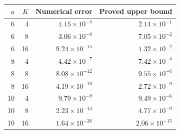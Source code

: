 \begin{tabular}{rrrr}
\toprule
$a$ & $K$ & Numerical error & Proved upper bound \\
\midrule
6 & 4 & $1.15\times10^{-5}$ & $2.14\times10^{-1}$ \\
6 & 8 & $3.06\times10^{-8}$ & $7.05\times10^{-2}$ \\
6 & 16 & $9.24\times10^{-15}$ & $1.32\times10^{-2}$ \\
8 & 4 & $4.42\times10^{-7}$ & $7.42\times10^{-4}$ \\
8 & 8 & $8.08\times10^{-12}$ & $9.55\times10^{-6}$ \\
8 & 16 & $4.19\times10^{-19}$ & $2.72\times10^{-9}$ \\
10 & 4 & $9.79\times10^{-9}$ & $9.49\times10^{-6}$ \\
10 & 8 & $2.23\times10^{-14}$ & $4.77\times10^{-9}$ \\
10 & 16 & $1.64\times10^{-26}$ & $2.06\times10^{-15}$ \\
\bottomrule
\end{tabular}
